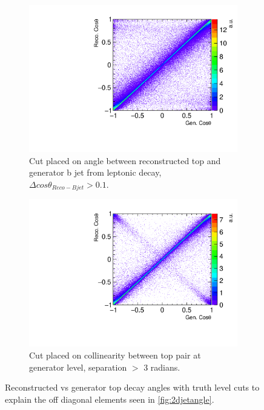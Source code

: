\begin{figure}
  \centering
  \begin{subfigure}{.48\textwidth}
    \centering
    \includegraphics[width=1.0\textwidth]{TopAnalysis/figures/CosThetaRecoVsMC_NotNextToLepTop.pdf}%
    \caption[Cut placed on angle between reconstructed top and generator b jet from leptonic decay]{Cut placed on angle between reconstructed top and generator b jet from leptonic decay, $\Delta cos\theta_{Reco-Bjet}>0.1$.}
    \label{fig:2djetangle_farfromleptop}
  \end{subfigure}\hfill
  \begin{subfigure}{.48\textwidth}
    \centering
    \includegraphics[width=1.0\textwidth]{TopAnalysis/figures/CosThetaRecoVsMC_MCTopsWellSeparated.pdf}%
    \caption[Cut placed on collinearity between top pair at generator level]{Cut placed on collinearity between top pair at generator level, separation $>$ 3 radians.}
    \label{fig:2djetangle_goodtopseparation}
  \end{subfigure}
  \caption[Reconstructed vs generator top decay angles with truth level cuts]{Reconstructed vs generator top decay angles with truth level cuts to explain the off diagonal elements seen in \ref{fig:2djetangle}.}
  \label{fig:2djetangle_explanations}
\end{figure}


